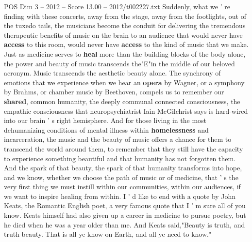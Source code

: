 \begin{textsample}{POS Dim 3 – 2012 – Score 13.00 – 2012/t002227.txt}
Suddenly, what we ' re finding with these concerts, away from the stage, away from the footlights, out of the tuxedo tails, the musicians become the conduit for delivering the tremendous therapeutic benefits of music on the brain to an audience that would never have \textbf{access} to this room, would never have \textbf{access} to the kind of music that we make.
Just as medicine serves to \textbf{heal} more than the building blocks of the body alone, the power and beauty of music transcends the"E"in the middle of our beloved acronym.
Music transcends the aesthetic beauty alone.
The synchrony of emotions that we experience when we hear an \textbf{opera} by Wagner, or a symphony by Brahms, or chamber music by Beethoven, compels us to remember our \textbf{shared}, common humanity, the deeply communal connected consciousness, the empathic consciousness that neuropsychiatrist Iain McGilchrist says is hard-wired into our brain ' s right hemisphere.
And for those living in the most dehumanizing conditions of mental illness within \textbf{homelessness} and incarceration, the music and the beauty of music offers a chance for them to transcend the world around them, to remember that they still have the capacity to experience something beautiful and that humanity has not forgotten them.
And the spark of that beauty, the spark of that humanity transforms into hope, and we know, whether we choose the path of music or of medicine, that ' s the very first thing we must instill within our communities, within our audiences, if we want to inspire healing from within.
I ' d like to end with a quote by John Keats, the Romantic English poet, a very famous quote that I ' m sure all of you know.
Keats himself had also given up a career in medicine to pursue poetry, but he died when he was a year older than me.
And Keats said,"Beauty is truth, and truth beauty.
That is all ye know on Earth, and all ye need to know."

\end{textsample}
